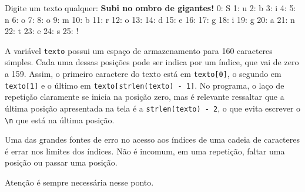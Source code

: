 \documentclass[
  11pt,
  a4paper,
]{scrbook}
\newenvironment{Shaded}{\begin{snugshade}}{\end{snugshade}}
\newcommand{\KeywordTok}[1]{\textcolor[rgb]{0.13,0.29,0.53}{\textbf{#1}}}
\newcommand{\NormalTok}[1]{#1}
\begin{document}
\begin{Shaded}
\begin{Highlighting}[]
\NormalTok{Digite um texto qualquer:}
\KeywordTok{ Subi no ombro de gigantes! }
\NormalTok{ 0: \textquotesingle{}S\textquotesingle{}}
\NormalTok{ 1: \textquotesingle{}u\textquotesingle{}}
\NormalTok{ 2: \textquotesingle{}b\textquotesingle{}}
\NormalTok{ 3: \textquotesingle{}i\textquotesingle{}}
\NormalTok{ 4: \textquotesingle{} \textquotesingle{}}
\NormalTok{ 5: \textquotesingle{}n\textquotesingle{}}
\NormalTok{ 6: \textquotesingle{}o\textquotesingle{}}
\NormalTok{ 7: \textquotesingle{} \textquotesingle{}}
\NormalTok{ 8: \textquotesingle{}o\textquotesingle{}}
\NormalTok{ 9: \textquotesingle{}m\textquotesingle{}}
\NormalTok{10: \textquotesingle{}b\textquotesingle{}}
\NormalTok{11: \textquotesingle{}r\textquotesingle{}}
\NormalTok{12: \textquotesingle{}o\textquotesingle{}}
\NormalTok{13: \textquotesingle{} \textquotesingle{}}
\NormalTok{14: \textquotesingle{}d\textquotesingle{}}
\NormalTok{15: \textquotesingle{}e\textquotesingle{}}
\NormalTok{16: \textquotesingle{} \textquotesingle{}}
\NormalTok{17: \textquotesingle{}g\textquotesingle{}}
\NormalTok{18: \textquotesingle{}i\textquotesingle{}}
\NormalTok{19: \textquotesingle{}g\textquotesingle{}}
\NormalTok{20: \textquotesingle{}a\textquotesingle{}}
\NormalTok{21: \textquotesingle{}n\textquotesingle{}}
\NormalTok{22: \textquotesingle{}t\textquotesingle{}}
\NormalTok{23: \textquotesingle{}e\textquotesingle{}}
\NormalTok{24: \textquotesingle{}s\textquotesingle{}}
\NormalTok{25: \textquotesingle{}!\textquotesingle{}}
\end{Highlighting}
\end{Shaded}

A variável \texttt{texto} possui um espaço de armazenamento para 160
caracteres simples. Cada uma dessas posições pode ser indica por um
índice, que vai de zero a 159. Assim, o primeiro caractere do texto está
em \texttt{texto{[}0{]}}, o segundo em \texttt{texto{[}1{]}} e o último
em \texttt{texto{[}strlen(texto)\ -\ 1{]}}. No programa, o laço de
repetição claramente se inicia na posição zero, mas é relevante
ressaltar que a última posição apresentada na tela é a
\texttt{strlen(texto)\ -\ 2}, o que evita escrever o
\texttt{\textbackslash{}n} que está na última posição.

\begin{tcolorbox}[enhanced jigsaw, arc=.35mm, bottomtitle=1mm, colbacktitle=quarto-callout-tip-color!10!white, title=\textcolor{quarto-callout-tip-color}{\faLightbulb}\hspace{0.5em}{Dica}, toprule=.15mm, left=2mm, opacityback=0, colback=white, colframe=quarto-callout-tip-color-frame, opacitybacktitle=0.6, bottomrule=.15mm, leftrule=.75mm, toptitle=1mm, coltitle=black, titlerule=0mm, rightrule=.15mm, breakable]

Uma das grandes fontes de erro no acesso aos índices de uma cadeia de
caracteres é errar nos limites dos índices. Não é incomum, em uma
repetição, faltar uma posição ou passar uma posição.

Atenção é sempre necessária nesse ponto.

\end{tcolorbox}
\end{document}
